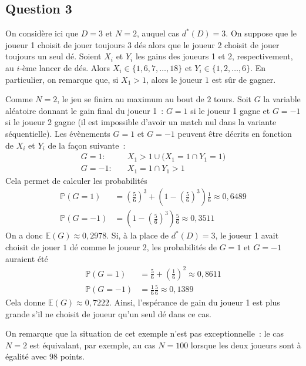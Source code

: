 \documentclass[a4paper,11pt]{amsart}
\theoremstyle{plain}
\begin{document}

\subsection{Question 3}

On considère ici que $D = 3$ et $N = 2$, auquel cas $d^\ast(D) = 3$. On suppose que le joueur 1 choisit de jouer toujours $3$ dés alors que le joueur 2 choisit de jouer toujours un seul dé. Soient $X_i$ et $Y_i$ les gains des joueurs 1 et 2, respectivement, au $i$-ème lancer de dés. Alors $X_i \in \{1, 6, 7, \dotsc, 18\}$ et $Y_i \in \{1, 2, \dotsc, 6\}$. En particulier, on remarque que, si $X_1 > 1$, alors le joueur $1$ est sûr de gagner.

Comme $N = 2$, le jeu se finira au maximum au bout de $2$ tours. Soit $G$ la variable aléatoire donnant le gain final du joueur 1~: $G = 1$ si le joueur 1 gagne et $G = -1$ si le joueur 2 gagne (il est impossible d'avoir un match nul dans la variante séquentielle). Les évènements $G = 1$ et $G = -1$ peuvent être décrits en fonction de $X_i$ et $Y_i$ de la façon suivante~:
\begin{align*}
G = 1 : \quad & X_1 > 1 \cup \bigl(X_1 = 1 \cap Y_1 = 1\bigr) \\
G = -1 : \quad & X_1 = 1 \cap Y_1 > 1
\end{align*}
Cela permet de calculer les probabilités
\begin{align*}
\mathbb P(G = 1) & = \left(\frac{5}{6}\right)^3 + \left(1 - \left(\frac{5}{6}\right)^3\right)\frac{1}{6} \approx 0,6489\\
\mathbb P(G = -1) & = \left(1 - \left(\frac{5}{6}\right)^3\right) \frac{5}{6} \approx 0,3511
\end{align*}
On a donc $\mathbb E(G) \approx 0,2978$. Si, à la place de $d^\ast(D) = 3$, le joueur 1 avait choisit de jouer $1$ dé comme le joueur 2, les probabilités de $G = 1$ et $G = -1$ auraient été
\begin{align*}
\mathbb P(G = 1) & = \frac{5}{6} + \left(\frac{1}{6}\right)^2 \approx 0,8611\\
\mathbb P(G = -1) & = \frac{1}{6} \frac{5}{6} \approx 0,1389
\end{align*}
Cela donne $\mathbb E(G) \approx 0,7222$. Ainsi, l'espérance de gain du joueur 1 est plus grande s'il ne choisit de joueur qu'un seul dé dans ce cas.

On remarque que la situation de cet exemple n'est pas exceptionnelle~: le cas $N = 2$ est équivalant, par exemple, au cas $N = 100$ lorsque les deux joueurs sont à égalité avec $98$ points.
\end{document}
